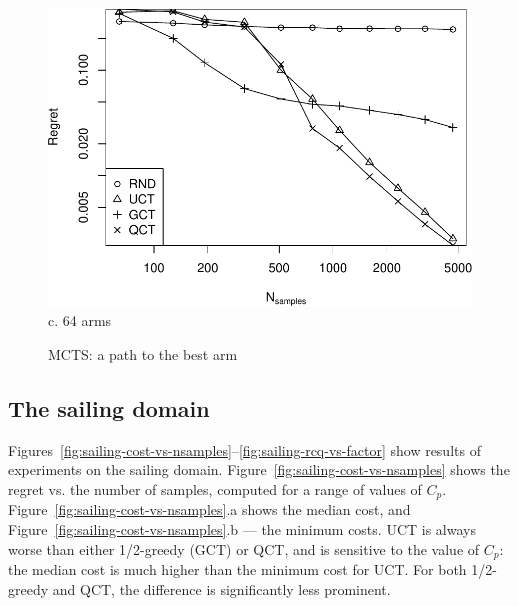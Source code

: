 \documentclass{article}
\begin{document}
\begin{figure}
\begin{minipage}[c]{0.5\linewidth}
    \includegraphics[scale=0.4]{tree-identity-k=64-uqb=8.pdf} \\
    c. 64 arms
 \end{minipage}
  \label{fig:mcts-regret}
  \caption{MCTS: a path to the best arm}
\end{figure}

\subsection{The sailing domain}
\label{seq:emp-sailing}

Figures~\ref{fig:sailing-cost-vs-nsamples}--\ref{fig:sailing-rcq-vs-factor}
show results of experiments on the sailing
domain. Figure~\ref{fig:sailing-cost-vs-nsamples} shows the regret
vs. the number of samples, computed for a range of values of
$C_p$. Figure~\ref{fig:sailing-cost-vs-nsamples}.a shows the median
cost, and Figure~\ref{fig:sailing-cost-vs-nsamples}.b --- the minimum
costs. UCT is always worse than either 1/2-greedy (GCT) or QCT, and is sensitive to
the value of $C_p$: the median cost is much higher than the minimum
cost for UCT. For both 1/2-greedy and QCT, the difference is
significantly less prominent.
\end{document}
